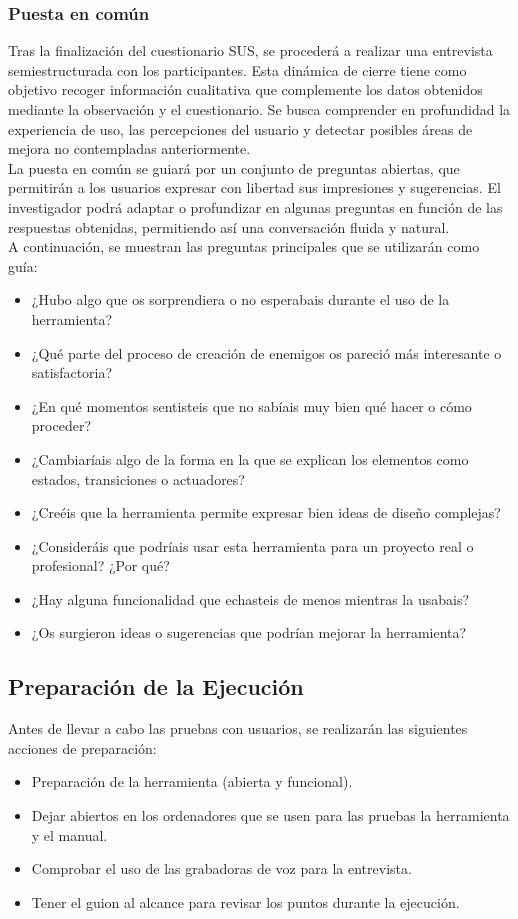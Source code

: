 \subsubsection{Puesta en común}
Tras la finalización del cuestionario SUS, se procederá a realizar una entrevista semiestructurada con los participantes. Esta dinámica de cierre tiene como objetivo recoger información cualitativa que complemente los datos obtenidos mediante la observación y el cuestionario. Se busca comprender en profundidad la experiencia de uso, las percepciones del usuario y detectar posibles áreas de mejora no contempladas anteriormente.\\

La puesta en común se guiará por un conjunto de preguntas abiertas, que permitirán a los usuarios expresar con libertad sus impresiones y sugerencias. El investigador podrá adaptar o profundizar en algunas preguntas en función de las respuestas obtenidas, permitiendo así una conversación fluida y natural.\\

A continuación, se muestran las preguntas principales que se utilizarán como guía:

\begin{itemize}
\item ¿Hubo algo que os sorprendiera o no esperabais durante el uso de la herramienta?
\item ¿Qué parte del proceso de creación de enemigos os pareció más interesante o satisfactoria?
\item ¿En qué momentos sentisteis que no sabíais muy bien qué hacer o cómo proceder?
\item ¿Cambiaríais algo de la forma en la que se explican los elementos como estados, transiciones o actuadores?
\item ¿Creéis que la herramienta permite expresar bien ideas de diseño complejas?
\item ¿Consideráis que podríais usar esta herramienta para un proyecto real o profesional? ¿Por qué?
\item ¿Hay alguna funcionalidad que echasteis de menos mientras la usabais?
\item ¿Os surgieron ideas o sugerencias que podrían mejorar la herramienta?
\end{itemize}

\subsection{Preparación de la Ejecución}
Antes de llevar a cabo las pruebas con usuarios, se realizarán las siguientes acciones de preparación:
\begin{itemize}
\item Preparación de la herramienta (abierta y funcional).
\item Dejar abiertos en los ordenadores que se usen para las pruebas la herramienta y el manual.
\item Comprobar el uso de las grabadoras de voz para la entrevista.
\item Tener el guion al alcance para revisar los puntos durante la ejecución.
\end{itemize}

